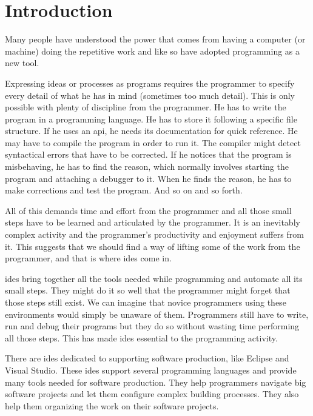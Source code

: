 \documentclass{./llncs2e/llncs}
\begin{document}
\tableofcontents

\acresetall

\section{Introduction}
	Many people have understood the power that comes from having a computer (or machine) doing the repetitive work and like so have adopted programming as a new tool.

	Expressing ideas or processes as programs requires the programmer to specify every detail of what he has in mind (sometimes too much detail).
	This is only possible with plenty of discipline from the programmer.
	He has to write the program in a programming language.
	He has to store it following a specific file structure.
	If he uses an \ac{api}, he needs its documentation for quick reference.
	He may have to compile the program in order to run it.
	The compiler might detect syntactical errors that have to be corrected.
	If he notices that the program is misbehaving, he has to find the reason, which normally involves starting the program and attaching a debugger to it.
	When he finds the reason, he has to make corrections and test the program.
	And so on and so forth.

	All of this demands time and effort from the programmer and all those small steps have to be learned and articulated by the programmer.
	It is an inevitably complex activity and the programmer's productivity and enjoyment suffers from it.
	This suggests that we should find a way of lifting some of the work from the programmer, and that is where \acp{ide} come in.

	\acp{ide} bring together all the tools needed while programming and automate all its small steps.
	They might do it so well that the programmer might forget that those steps still exist.
	We can imagine that novice programmers using these environments would simply be unaware of them.
	Programmers still have to write, run and debug their programs but they do so without wasting time performing all those steps.
	This has made \acp{ide} essential to the programming activity.
	
	There are \ac{ide}s dedicated to supporting software production, like Eclipse\cite{eclipse2007eclipse} and Visual Studio\cite{mvs2002mvs}.
	These \ac{ide}s support several programming languages and provide many tools needed for software production.
	They help programmers navigate big software projects and let them configure complex building processes.
	They also help them organizing the work on their software projects.
	
\end{document}
